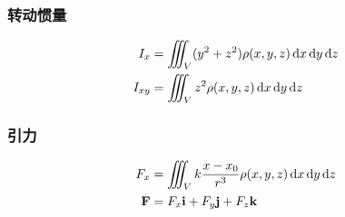 \subsubsection{转动惯量}
\[\begin{aligned}
I_x&=\iiint_V(y^2+z^2)\rho(x,y,z)\,\mathrm{d} x\,\mathrm{d} y\,\mathrm{d} z\\
I_{xy}&=\iiint_Vz^2\rho(x,y,z)\,\mathrm{d} x\,\mathrm{d} y\,\mathrm{d} z
\end{aligned}\]

\subsubsection{引力}
\[\begin{aligned}
F_x&=\iiint_Vk\frac{x-x_0}{r^3}\rho(x,y,z)\,\mathrm{d} x\,\mathrm{d} y\,\mathrm{d} z\\
\mathbf{F}&=F_x\mathbf{i}+F_y\mathbf{j}+F_z\mathbf{k}
\end{aligned}\]